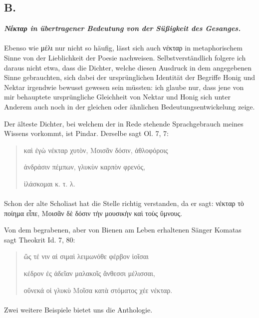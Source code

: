 \documentclass[a4paper, 11pt, oneside]{article}
\begin{document}
\subsection{B.}
\begin{center}
\textbf{\emph{Νέκταρ in übertragener Bedeutung von der Süßigkeit des Gesanges.}}
\end{center}
\paragraph{}
Ebenso wie μέλι nur nicht so häufig, lässt sich auch νέκταρ in metaphorischem Sinne von der Lieblichkeit der Poesie nachweisen. Selbstverständlich folgere ich daraus nicht etwa, dass die Dichter, welche diesen Ausdruck in dem angegebenen Sinne gebrauchten, sich dabei der ursprünglichen Identität der Begriffe Honig und Nektar irgendwie bewusst gewesen sein müssten: ich glaube nur, dass jene von mir behauptete ursprüngliche Gleichheit von Nektar und Honig sich unter Anderem auch noch in der gleichen oder ähnlichen Bedeutungsentwickelung zeige.

Der älteste Dichter, bei welchem der in Rede stehende Sprachgebrauch meines Wissens vorkommt, ist Pindar. Derselbe sagt Ol. 7, 7:
\begin{quotation}
καὶ ἐγὼ νέκταρ χυτὸν, Μοισᾶν δόσιν, ἀθλοφόροις

ἀνδράσιν πέμπων, γλυκὺν καρπὸν φρενός,

ἱλάσκομαι κ. τ. λ.
\end{quotation}
\paragraph{}
Schon der alte Scholiast hat die Stelle richtig verstanden, da er sagt: νέκταρ τὸ ποίημα εἶπε, Μοισᾶν δὲ δόσιν τὴν μουσικὴν καὶ τοὺς ὕμνους.

Von dem begrabenen, aber von Bienen am Leben erhaltenen Sänger Komatas sagt Theokrit Id. 7, 80:
\begin{quotation}
ὥς τέ νιν αἱ σιμαὶ λειμωνόθε φέρβον ἰοῖσαι

κέδρον ἐς ἀδεῖαν μαλακοῖς ἄνθεσσι μέλισσαι,

οὔνεκά οἱ γλυκὺ Μοῖσα κατὰ στόματος χέε νέκταρ.
\end{quotation}
\paragraph{}
Zwei weitere Beispiele bietet uns die Anthologie.
\end{document}
